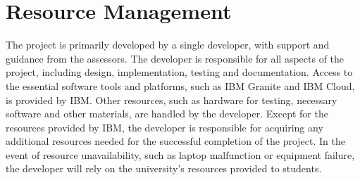 \documentclass[10pt]{article}
\begin{document}
\section{Resource Management}

    The project is primarily developed by a single developer, with support and guidance from the assessors. The developer is responsible for all aspects of the project, including design, implementation, testing and documentation.
    Access to the essential software tools and platforms, such as IBM Granite and IBM Cloud, is provided by IBM. Other resources, such as hardware for testing, necessary software and other materials, are handled by the developer. Except for the
    resources provided by IBM, the developer is responsible for acquiring any additional resources needed for the successful completion of the project. In the event of resource unavailability, such as laptop malfunction or equipment failure, the
    developer will rely on the university's resources provided to students.
\end{document}

